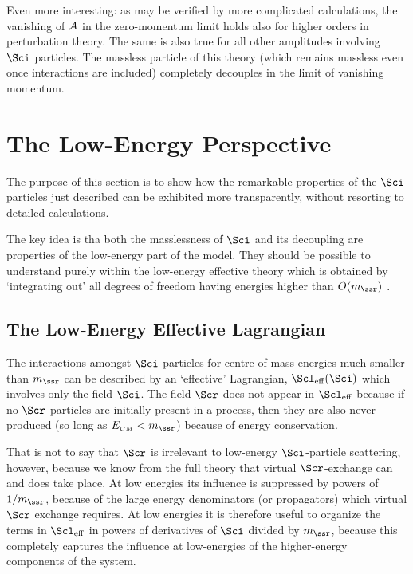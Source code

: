 \documentclass[12pt]{article}
\def\Sca{{\cal A}}
\def\sss{\scriptscriptstyle}
\begin{document}
Even more interesting: as may be verified by more complicated 
calculations, the vanishing of $\Sca$ in the zero-momentum limit 
holds also for higher orders in perturbation theory. The same is
also true for all other amplitudes involving $\Sci$ particles. The
massless particle of this theory (which remains massless even once
interactions are included) completely decouples in the limit of 
vanishing momentum.

\section{The Low-Energy Perspective}

The purpose of this section is to show how the remarkable properties 
of the $\Sci$ particles just described can be exhibited more 
transparently, without resorting to detailed calculations.

The key idea is tha both the masslessness of $\Sci$ 
and its decoupling are properties
of the low-energy part of the model. They should be possible to
understand purely within the low-energy effective theory 
which is obtained by `integrating out' all degrees of freedom 
having energies higher than $O(m_\ssr)$ \cite{ETbooks,ETreviews}. 

\subsection{The Low-Energy Effective Lagrangian}

The interactions amongst $\Sci$ particles for centre-of-mass
energies much smaller than $m_\ssr$ can be described by
an `effective' Lagrangian, $\Scl_{\rm eff}(\Sci)$ 
which involves only the field $\Sci$. The field $\Scr$ does not 
appear in $\Scl_{\rm eff}$ because if no $\Scr$-particles
are initially present in a process, then they are also never 
produced (so long as $E_{\sss CM} < m_\ssr$) because
of energy conservation.  

That is not to say that $\Scr$ is irrelevant to low-energy $\Sci$-particle
scattering, however, because we know from the full theory
that virtual $\Scr$-exchange can and does take place. At low
energies its influence is suppressed by powers of $1/m_\ssr$,
because of the large energy denominators (or propagators)
which virtual $\Scr$ exchange requires. At low energies it is 
therefore useful to organize the terms in $\Scl_{\rm eff}$ in
powers of derivatives of $\Sci$ divided by $m_\ssr$, because
this completely captures the influence at low-energies of the
higher-energy components of the system.
\end{document}
